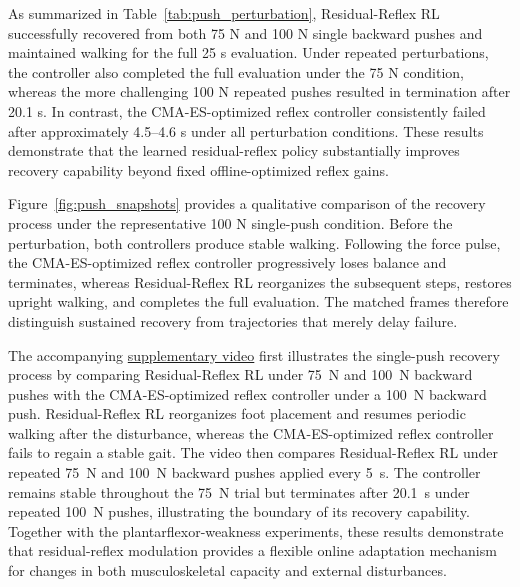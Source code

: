 \documentclass[acmtog,screen]{acmart}
\newcommand{\suppvideo}{\href{https://github.com/zhjccoffee/Supplementary-supporting-video}{supplementary video}}
\begin{document}
As summarized in Table~\ref{tab:push_perturbation}, Residual-Reflex RL successfully recovered from both 75 N and 100 N single backward pushes and maintained walking for the full 25 s evaluation. Under repeated perturbations, the controller also completed the full evaluation under the 75 N condition, whereas the more challenging 100 N repeated pushes resulted in termination after 20.1 s. In contrast, the CMA-ES-optimized reflex controller consistently failed after approximately 4.5–4.6 s under all perturbation conditions. These results demonstrate that the learned residual-reflex policy substantially improves recovery capability beyond fixed offline-optimized reflex gains.

Figure~\ref{fig:push_snapshots} provides a qualitative comparison of the recovery process under the representative 100 N single-push condition. Before the perturbation, both controllers produce stable walking. Following the force pulse, the CMA-ES-optimized reflex controller progressively loses balance and terminates, whereas Residual-Reflex RL reorganizes the subsequent steps, restores upright walking, and completes the full evaluation. The matched frames therefore distinguish sustained recovery from trajectories that merely delay failure.

The accompanying \suppvideo{} first illustrates the single-push recovery process by comparing Residual-Reflex RL under 75~N and 100~N backward pushes with the CMA-ES-optimized reflex controller under a 100~N backward push. Residual-Reflex RL reorganizes foot placement and resumes periodic walking after the disturbance, whereas the CMA-ES-optimized reflex controller fails to regain a stable gait. The video then compares Residual-Reflex RL under repeated 75~N and 100~N backward pushes applied every 5~s. The controller remains stable throughout the 75~N trial but terminates after 20.1~s under repeated 100~N pushes, illustrating the boundary of its recovery capability. Together with the plantarflexor-weakness experiments, these results demonstrate that residual-reflex modulation provides a flexible online adaptation mechanism for changes in both musculoskeletal capacity and external disturbances.
\end{document}

